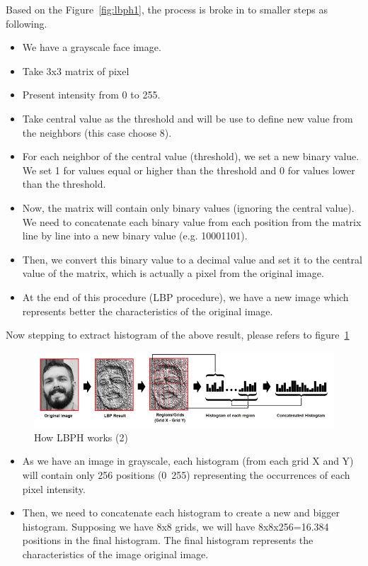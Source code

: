 Based on the Figure~\ref{fig:lbph1}, the process is broke in to smaller steps as following.
\begin{itemize}
\item We have a grayscale face image.
\item Take 3x3 matrix of pixel
\item Present intensity from 0 to 255.
\item Take central value as the threshold and will be use to define new value from the neighbors (this case choose 8).
\item For each neighbor of the central value (threshold), we set a new binary value. We set 1 for values equal or higher than the threshold and 0 for values lower than the threshold.
\item Now, the matrix will contain only binary values (ignoring the central value). We need to concatenate each binary value from each position from the matrix line by line into a new binary value (e.g. 10001101). 
\item Then, we convert this binary value to a decimal value and set it to the central value of the matrix, which is actually a pixel from the original image.
\item At the end of this procedure (LBP procedure), we have a new image which represents better the characteristics of the original image.
\end{itemize}
Now stepping to extract histogram of the above result, please refers to figure~\ref{fig:lbph2}
\begin{figure}[!ht]
  \begin{center}
    \includegraphics[scale=0.5]{images/lbph2.png}
    \caption{How LBPH works (2)}
    \label{fig:lbph2}
  \end{center}
\end{figure}
\begin{itemize}
\item As we have an image in grayscale, each histogram (from each grid X and Y) will contain only 256 positions (0~255) representing the occurrences of each pixel intensity.
\item Then, we need to concatenate each histogram to create a new and bigger histogram. Supposing we have 8x8 grids, we will have 8x8x256=16.384 positions in the final histogram. The final histogram represents the characteristics of the image original image.
\end{itemize}





  


